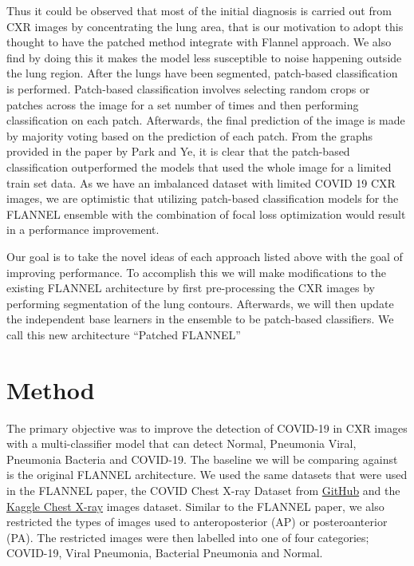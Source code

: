 \documentclass{sigkddExp}
\begin{document}
Thus it could be observed that most of the initial diagnosis is carried out from
CXR images by concentrating the lung area, that is our motivation to adopt this
thought to have the patched method integrate with Flannel approach. We also find
by doing this it makes the model less susceptible to noise happening outside the
lung region. After the lungs have been segmented, patch-based classification is
performed. Patch-based classification involves selecting random crops or patches
across the image for a set number of times and then performing classification on
each patch. Afterwards, the final prediction of the image is made by majority
voting based on the prediction of each patch. From the graphs provided in the
paper \cite{pmid32396075} by Park and Ye, it is clear that the patch-based
classification outperformed the models that used the whole image for a limited
train set data. As we have an imbalanced dataset with limited COVID 19 CXR
images, we are optimistic that utilizing patch-based classification models for
the FLANNEL ensemble with the combination of focal loss optimization would
result in a performance improvement.

Our goal is to take the novel ideas of each approach listed above with the goal
of improving performance. To accomplish this we will make modifications to the
existing FLANNEL architecture by first pre-processing the CXR images by
performing segmentation of the lung contours. Afterwards, we will then update
the independent base learners in the ensemble to be patch-based classifiers. We
call this new architecture “Patched FLANNEL”



\section{Method}

The primary objective was to improve the detection of COVID-19 in CXR images
with a multi-classifier model that can detect Normal, Pneumonia Viral, Pneumonia
Bacteria and COVID-19. The baseline we will be comparing against is the original
FLANNEL architecture. We used the same datasets that were used in the FLANNEL
paper, the COVID Chest X-ray Dataset from
\href{https://github.com/ieee8023/covid-chestxray-dataset}{GitHub} and the
\href{https://www.kaggle.com/paultimothymooney/chest-xray-pneumonia}{Kaggle
Chest X-ray} images dataset. Similar to the FLANNEL paper, we also restricted
the types of images used to anteroposterior (AP) or posteroanterior (PA). The
restricted images were then labelled into one of four categories; COVID-19,
Viral Pneumonia, Bacterial Pneumonia and Normal.
\end{document}
